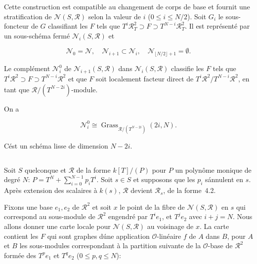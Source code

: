 \documentclass[11pt,a4paper]{article}
\theoremstyle{plain}
\theoremstyle{definition}
\DeclareMathOperator{\Grass}{Grass}
\begin{document}
Cette construction est compatible au changement de corps de base et fournit
une stratification de $\mathscr{N}(S, \mathscr{R})$ selon la valeur de $i$ ($0 \leq i \leq N/2$). Soit $G_i$ le
sous-foncteur de $G$ classifiant les $F$ tels que $T^i \mathscr{R}_T^2 \supset F \supset T^{N-i}\mathscr{R}_T^2$. Il est
repr\'esent\'e par un sous-sch\'ema ferm\'e $\mathscr{N}_i(S, \mathscr{R})$ et

\begin{equation}
\mathscr{N}_0 = \mathscr{N}, \quad \mathscr{N}_{i+1} \subset \mathscr{N}_i, \quad \mathscr{N}_{\lfloor N/2 \rfloor + 1} = \emptyset.
\end{equation}

Le compl\'ement $\mathscr{N}_i^0$ de $\mathscr{N}_{i+1}(S, \mathscr{R})$ dans $\mathscr{N}_i(S, \mathscr{R})$ classifie les $F$ tels que
$T^i \mathscr{R}^2 \supset F \supset T^{N-i}\mathscr{R}^2$ et que $F$ soit localement facteur direct de $T^i\mathscr{R}^2/T^{N-i}\mathscr{R}^2$,
en tant que $\mathscr{R}/(T^{N-2i})$-module.

On a

\begin{equation}
\mathscr{N}_i^0 \cong \Grass_{\mathscr{R}/(T^{N-2i})}(2i, N).
\end{equation}

C\'est un sch\'ema lisse de dimension $N - 2i$.

\subsection{}

Soit $S$ quelconque et $\mathscr{R}$ de la forme $k[T]/(P)$ pour $P$ un polyn\^ome monique
de degr\'e $N$: $P = T^N + \sum_{i=0}^{N-1} p_i T^i$. Soit $s \in S$ et supposons que les $p_i$ s\'annulent en
$s$. Apr\`es extension des scalaires \`a $k(s)$, $\mathscr{R}$ devient $\mathscr{R}_s$, de la forme~4.2.

Fixons une base $e_1, e_2$ de $\mathscr{R}^2$ et soit $x$ le point de la fibre de $\mathscr{N}(S, \mathscr{R})$ en $s$
qui correspond au sous-module de $\mathscr{R}^2$ engendr\'e par $T^i e_1$, et $T^j e_2$ avec
$i + j = N$. Nous allons donner une carte locale pour $\mathscr{N}(S, \mathscr{R})$ au voisinage de $x$.
La carte contient les $F$ qui sont graphes d\'une application $\mathscr{O}$-lin\'eaire $f$ de $A$
dans $B$, pour $A$ et $B$ les sous-modules correspondant \`a la partition suivante de
la $\mathscr{O}$-base de $\mathscr{R}^2$ form\'ee des $T^p e_1$ et $T^q e_2$ ($0 \leq p, q \leq N$):
\end{document}
